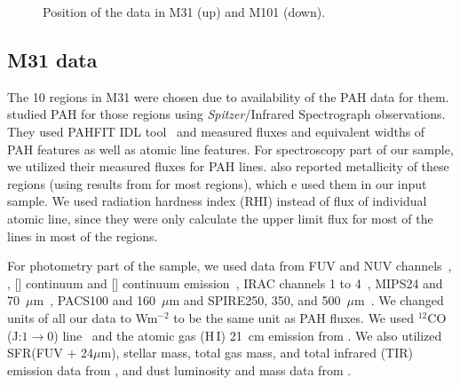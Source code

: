   \begin{figure}
    \hfill
    \caption{Position of the data in M31 (up) and M101 (down).}
    \label{fig:dummy}
  \end{figure}

    \subsection{M31 data}
      
     
     The 10 regions in M31 were chosen due to availability of the PAH data for them. 
     \cite{Dim15} studied PAH for those regions using {\it Spitzer}/Infrared Spectrograph\citep[IRS,][]{Houck04b} observations. 
     They used {\tiny PAHFIT IDL} tool~\citep{Smith07b} and measured fluxes and equivalent widths of PAH features as well as atomic line features.
     For spectroscopy part of our sample, we utilized their measured fluxes for PAH lines. 
     \cite{Dim15} also reported metallicity of these regions (using results from \cite{Sanders12} for most regions), which e used them in our input sample.
     We used radiation hardness index (RHI) instead of flux of individual atomic line, since they were only calculate the upper limit flux for most of the lines in most of the regions.
     
     For photometry part of the sample, we used data from \GALEX FUV and NUV channels~\citep{Martin05}, \halpha, [\sii] continuum and [\oiii] continuum emission~\citep{Massey07}, IRAC channels 1 to 4~\citep{Barmby06}, MIPS24 and 70~$\mu$m~\citep{Gordon06}, PACS100 and 160~$\mu$m and SPIRE250, 350, and 500~$\mu$m~\citep{Fritz12}.
     We changed units of all our data to Wm$^{-2}$ to be the same unit as PAH fluxes.
     We used $^{12}$CO (J:$1\rightarrow0$) line~\citep{Nieten06} and the atomic gas (H\,{\sc I}) 21~cm emission from \cite{Chemin09}.
     We also utilized SFR(FUV + 24$\mu$m), stellar mass, total gas mass, and total infrared (TIR) emission data from \cite{Rahmani16}, and dust luminosity and mass data from \cite{Draine14}.


